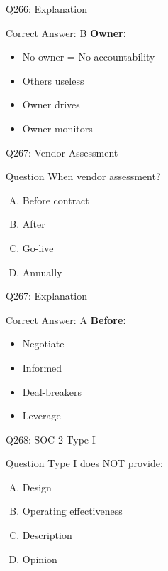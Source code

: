 \documentclass{beamer}
\begin{document}
	\begin{frame}{Q266: Explanation}
		\begin{block}{Correct Answer: B}
			\textbf{Owner:}
			\begin{itemize}
				\item No owner = No accountability
				\item Others useless
				\item Owner drives
				\item Owner monitors
			\end{itemize}
		\end{block}
	\end{frame}
	
	\begin{frame}{Q267: Vendor Assessment}
		\begin{block}{Question}
			When vendor assessment?
		\end{block}
		\begin{enumerate}[(A)]
			\item Before contract
			\item After
			\item Go-live
			\item Annually
		\end{enumerate}
	\end{frame}
	
	\begin{frame}{Q267: Explanation}
		\begin{block}{Correct Answer: A}
			\textbf{Before:}
			\begin{itemize}
				\item Negotiate
				\item Informed
				\item Deal-breakers
				\item Leverage
			\end{itemize}
		\end{block}
	\end{frame}
	
	\begin{frame}{Q268: SOC 2 Type I}
		\begin{block}{Question}
			Type I does NOT provide:
		\end{block}
		\begin{enumerate}[(A)]
			\item Design
			\item Operating effectiveness
			\item Description
			\item Opinion
		\end{enumerate}
	\end{frame}
	
\end{document}
